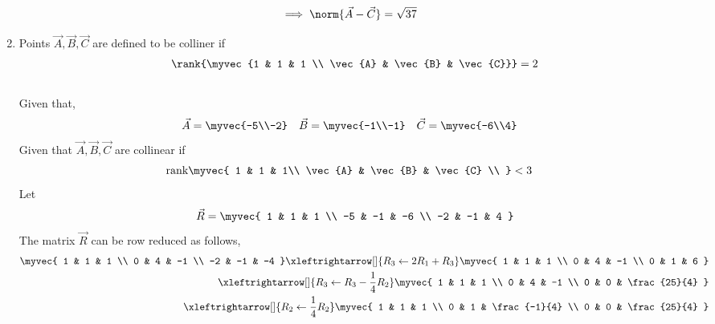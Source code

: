 \documentclass[11pt]{book}
\begin{document}
\begin{enumerate}[label=\thesection.\arabic*.,ref=\thesection.\theenumi]
\begin{align}
\implies \norm{\vec{A}-\vec{C}}&=\sqrt{37}
\end{align}
\item Points $\vec{A}, \vec{B}, \vec{C}$ are defined to be colliner if
	\begin{align}
		\rank{\myvec{1 & 1 & 1 \\ \vec{A} & \vec{B} & \vec{C}}} = 2
	\end{align}
\solution\\
Given that,
\begin{align}
    \vec{A} = \myvec{-5\\-2}
    \quad
    \vec{B} &= \myvec{-1\\-1}
    \quad
    \vec{C} = \myvec{-6\\4}
\end{align}
Given that $\vec{A},\vec{B},\vec{C}$ are collinear if
\begin{align}
    \text{rank}\myvec{
    1 & 1 & 1\\
    \vec{A} & \vec{B} & \vec{C} \\
    } &< 3 
    \label{eq:1.1.3.2}
\end{align} 
Let
\begin{align}
\vec{R} &= \myvec{
1 & 1 & 1 \\
-5 & -1 & -6 \\
-2 & -1 & 4
} \\
\end{align}
The matrix $\vec{R}$ can be row reduced as follows,
\begin{align}
\label{eq:matthrowoperations}
\myvec{
1 & 1 & 1 \\
0 & 4 & -1 \\
-2 & -1 & -4
}
\xleftrightarrow[]{R_3 \leftarrow 2R_1+R_3}
\myvec{
1 & 1 & 1 \\
0 & 4 & -1 \\
0 & 1 & 6
}\\
\xleftrightarrow[]{R_3 \leftarrow R_3 - \frac{1}{4}R_2}
\myvec{
1 & 1 & 1 \\
0 & 4 & -1 \\
0 & 0 & \frac{25}{4}
}\\
\xleftrightarrow[]{R_2 \leftarrow \frac{1}{4}R_2}
\myvec{
1 & 1 & 1 \\
0 & 1 & \frac{-1}{4} \\
0 & 0 & \frac{25}{4}
}
\end{align}



\end{enumerate}
\end{document}
